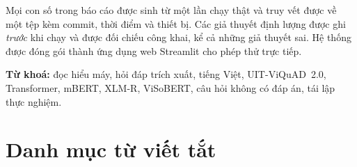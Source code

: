 Mọi con số trong báo cáo được sinh từ một lần chạy thật và truy vết được về một tệp
 kèm commit, thời điểm và thiết bị. Các giả thuyết định lượng được
ghi \emph{trước} khi chạy và được đối chiếu công khai, kể cả những giả thuyết sai.
Hệ thống được đóng gói thành ứng dụng web Streamlit cho phép thử trực tiếp.

\vspace{0.6em}
\noindent\textbf{Từ khoá:} đọc hiểu máy, hỏi đáp trích xuất, tiếng Việt, UIT-ViQuAD~2.0,
Transformer, mBERT, XLM-R, ViSoBERT, câu hỏi không có đáp án, tái lập thực nghiệm.

\clearpage
{
\tableofcontents
\clearpage
\listoffigures
{}
\vspace{1.5em}
\listoftables
{}
}

\vspace{1.5em}
\section*{Danh mục từ viết tắt}

